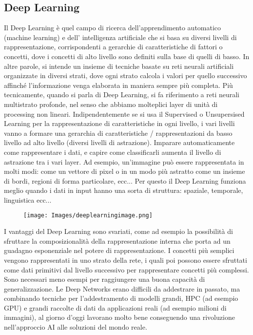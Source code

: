 \documentclass{article}
\begin{document}
\subsection{Deep Learning}
Il Deep Learning è quel campo di ricerca dell'apprendimento automatico (machine learning) e dell' intelligenza artificiale che si basa su diversi livelli di rappresentazione, corrispondenti a gerarchie di caratteristiche di fattori o concetti, dove i concetti di alto livello sono definiti sulla base di quelli di basso. In altre parole, si intende un insieme di tecniche basate su reti neurali artificiali organizzate in diversi strati, dove ogni strato calcola i valori per quello successivo affinché l'informazione venga elaborata in maniera sempre più completa. \newline
Più tecnicamente, quando si parla di Deep Learning, si fa riferimento a reti neurali multistrato profonde, nel senso che abbiamo molteplici layer di unità di processing non lineari. Indipendentemente se si usa il Supervised o Unsupersised Learning per la rappresentazione di caratteristiche in ogni livello, i vari livelli vanno a formare una gerarchia di caratteristiche / rappresentazioni da basso livello ad alto livello (diversi livelli di astrazione).
Imparare automaticamente come rappresentare i dati, e capire come classificarli aumenta il livello di astrazione tra i vari layer. Ad esempio, un'immagine può essere rappresentata in molti modi: come un vettore di pixel o in un modo più astratto come un insieme di bordi, regioni di forma particolare, ecc... Per questo il Deep Learning funziona meglio quando i dati in input hanno una sorta di struttura: spaziale, temporale, linguistica ecc...
\begin{figure}[H]
\centering
\texttt{[image: Images/deeplearningimage.png]}
\end{figure}
I vantaggi del Deep Learning sono svariati, come ad esempio la possibilità di sfruttare la composizionalità della rappresentazione interna che porta ad un guadagno esponenziale nel potere di rappresentazione. I concetti più semplici vengono rappresentati in uno strato della rete, i quali poi possono essere sfruttati come dati primitivi dal livello successivo per rappresentare concetti più complessi. Sono necessari meno esempi per raggiungere una buona capacità di generalizzazione. Le Deep Networks erano difficili da addestrare in passato, ma combinando tecniche per l'addestramento di modelli grandi, HPC (ad esempio GPU) e grandi raccolte di dati da applicazioni reali (ad esempio milioni di immagini), al giorno d'oggi lavorano molto bene conseguendo una rivoluzione nell'approccio AI alle soluzioni del mondo reale.







%
%
\end{document}
